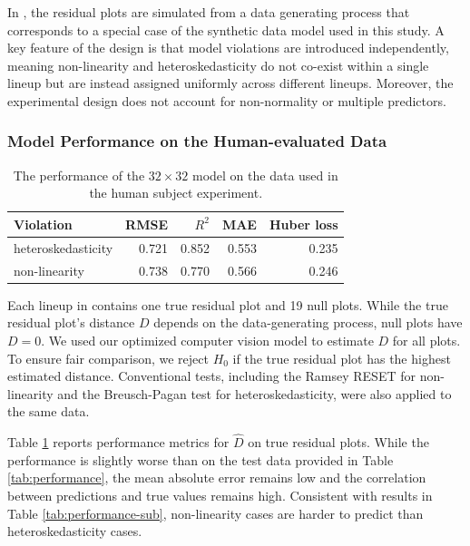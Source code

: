 \documentclass[]{interact}
\theoremstyle{plain}%
\theoremstyle{definition}
\theoremstyle{remark}
\begin{document}
In \citet{li2024plot}, the residual plots are simulated from a data
generating process that corresponds to a special case of the synthetic
data model used in this study. A key feature of the design is that model
violations are introduced independently, meaning non-linearity and
heteroskedasticity do not co-exist within a single lineup but are
instead assigned uniformly across different lineups. Moreover, the
experimental design does not account for non-normality or multiple
predictors.

\subsubsection{Model Performance on the Human-evaluated
Data}\label{model-performance-on-the-human-evaluated-data}

\begin{table}

\caption{\label{tab:experiment-performance}The performance of the $32 \times 32$ model on the data used in the human subject experiment.}
\centering
\begin{tabular}[t]{lrrrr}
\toprule
Violation & RMSE & $R^2$ & MAE & Huber loss\\
\midrule
heteroskedasticity & 0.721 & 0.852 & 0.553 & 0.235\\
non-linearity & 0.738 & 0.770 & 0.566 & 0.246\\
\bottomrule
\end{tabular}
\end{table}

Each lineup in \citet{li2024plot} contains one true residual plot and 19
null plots. While the true residual plot's distance \(D\) depends on the
data-generating process, null plots have \(D = 0\). We used our
optimized computer vision model to estimate \(D\) for all plots. To
ensure fair comparison, we reject \(H_0\) if the true residual plot has
the highest estimated distance. Conventional tests, including the Ramsey
RESET \citep{ramsey1969tests} for non-linearity and the Breusch-Pagan
test \citep{breusch1979simple} for heteroskedasticity, were also applied
to the same data.

Table \ref{tab:experiment-performance} reports performance metrics for
\(\hat{D}\) on true residual plots. While the performance is slightly
worse than on the test data provided in Table \ref{tab:performance}, the
mean absolute error remains low and the correlation between predictions
and true values remains high. Consistent with results in Table
\ref{tab:performance-sub}, non-linearity cases are harder to predict
than heteroskedasticity cases.
\end{document}

